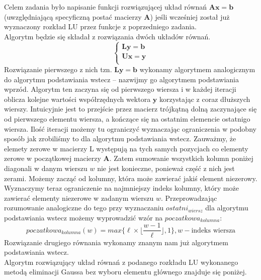 \documentclass[]{article}
\newcommand{\mA}{\bm{A}}
\newcommand{\mL}{\bm{L}}
\newcommand{\mU}{\bm{U}}
\newcommand{\vb}{\bm{b}}
\newcommand{\vx}{\bm{x}}
\begin{document}
	Celem zadania było napisanie funkcji rozwiązującej układ równań $\mA\vx=\vb$ (uwzględniającą specyficzną postać macierzy $\mA$) jeśli wcześniej został już wyznaczony rozkład LU przez funkcje z poprzedniego zadania.\\
	Algorytm będzie się składał z rozwiązania dwóch układów równań.
	 $$\left\{
	\begin{array}{ll}
	\mL \bm{y}= \vb\\
	\mU \vx= \bm{y} \\
	\end{array}
	\right.$$
	Rozwiązanie pierwszego z nich tzn. $\mL \bm{y}= \vb$ wykonamy algorytmem analogicznym do algorytmu podstawiania wstecz -- nazwijmy go algorytmem podstawiania wprzód. Algorytm ten zaczyna się od pierwszego wiersza i w każdej iteracji oblicza kolejne wartości współrzędnych wektora $\bm{y}$ korzystając z coraz dłuższych wierszy. Intuicyjnie jest to przejście przez macierz trójkątną dolną zaczynające się od pierwszego elementu wiersza, a kończące się na ostatnim elemencie ostatnigo wiersza. Ilość iteracji możemy tu ograniczyć wyznaczając ograniczenia w podobny sposób jak zrobiliśmy to dla algorytmu podstawiania wstecz. Zauważmy, że elemety zerowe w macierzy L występują na tych samych pozycjach co elementy zerowe w początkowej macierzy $\mA$. Zatem sumowanie wszystkich kolumn poniżej diagonali w danym wierszu $w$ nie jest konieczne, ponieważ część z nich jest zerami. Możemy zacząć od kolumny, która może zawierać jakiś element niezerowy. Wyznaczymy teraz ograniczenie na najmniejszy indeks kolumny, który może zawierać elementy niezerowe w zadanym wierszu $w$. 
	Przeprowadzając rozumowanie analogiczne do tego przy wyznaczaniu $ostatni_{wiersz}$ dla algorytmu podstawiania wstecz możemy wyprowadzić wzór na $poczatkowa_{kolumna}$:
	$$poczatkowa_{kolumna}(w) = max\lbrace \ell \times \lfloor \frac{w-1}{\ell}\rfloor , 1 \rbrace, w - \text{indeks wiersza}$$
	Rozwiązanie drugiego równania wykonamy znanym nam już algorytmem podstawiania wstecz.\\
	Algorytm rozwiązujący układ równań z podanego rozkładu LU wykonanego metodą eliminacji Gaussa bez wyboru elementu głównego znajduje się poniżej.
	
\end{document}
